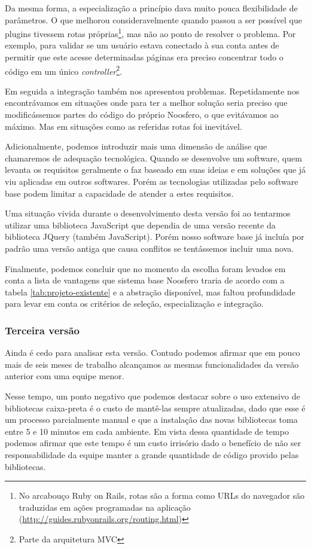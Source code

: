 \documentclass[12pt]{article}
\begin{document}
    Da mesma forma, a especialização a princípio dava muito pouca flexibilidade de parâmetros. O que melhorou consideravelmente quando passou a ser possível que plugins tivessem rotas próprias\footnote{No arcabouço Ruby on Rails, rotas são a forma como URLs do navegador são traduzidas em ações programadas na aplicação (\url{http://guides.rubyonrails.org/routing.html})}, mas não ao ponto de resolver o problema. Por exemplo, para validar se um usuário estava conectado à sua conta antes de permitir que este acesse determinadas páginas era preciso concentrar todo o código em um único \textit{controller}\footnote{Parte da arquitetura MVC}.

    Em seguida a integração também nos apresentou problemas. Repetidamente nos encontrávamos em situações onde para ter a melhor solução seria preciso que modificássemos partes do código do próprio Noosfero, o que evitávamos ao máximo. Mas em situações como as referidas rotas foi inevitável.

    Adicionalmente, podemos introduzir mais uma dimensão de análise que chamaremos de adequação tecnológica. Quando se desenvolve um software, quem levanta os requisitos geralmente o faz baseado em suas ideias e em soluções que já viu aplicadas em outros softwares. Porém as tecnologias utilizadas pelo software base podem limitar a capacidade de atender a estes requisitos.

    Uma situação vivida durante o desenvolvimento desta versão foi ao tentarmos utilizar uma biblioteca JavaScript que dependia de uma versão recente da biblioteca JQuery (também JavaScript). Porém nosso software base já incluía por padrão uma versão antiga que causa conflitos se tentássemos incluir uma nova.

    Finalmente, podemos concluir que no momento da escolha foram levados em conta a lista de vantagens que  sistema base Noosfero traria de acordo com a tabela \ref{tab:projeto-existente} e a abstração disponível, mas faltou profundidade para levar em conta os critérios de seleção, especialização e integração.

    \subsubsection{Terceira versão}
    Ainda é cedo para analisar esta versão. Contudo podemos afirmar que em pouco mais de seis meses de trabalho alcançamos as mesmas funcionalidades da versão anterior com uma equipe menor.

    Nesse tempo, um ponto negativo que podemos destacar sobre o uso extensivo de bibliotecas caixa-preta é o custo de mantê-las sempre atualizadas, dado que esse é um processo parcialmente manual e que a instalação das novas bibliotecas toma entre 5 e 10 minutos em cada ambiente. Em vista dessa quantidade de tempo podemos afirmar que este tempo é um custo irrisório dado o benefício de não ser responsabilidade da equipe manter a grande quantidade de código provido pelas bibliotecas.
\end{document}
